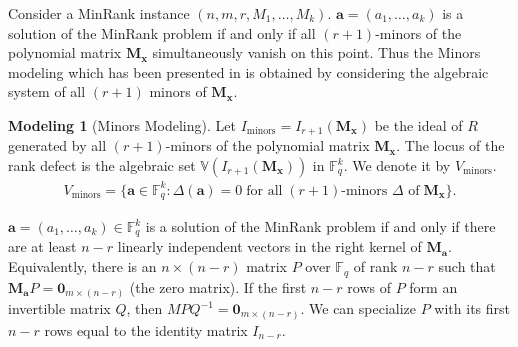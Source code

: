 \documentclass[a4paper, 11pt]{amsart}
\newcommand{\mb}[1]{\mathbb{#1}}
\newcommand{\td}[1]{\bm{#1}}
\newcommand{\tx}[1]{\text{#1}}
\newcommand{\fq}{\mathbb{F}_q}
\theoremstyle{definition}
\theoremstyle{definition}
\newtheorem{model}{Modeling}
\begin{document}
	Consider a MinRank instance $(n,m,r,M_1,\dots,M_k)$. $\td{a}=(a_1,\dots,a_k)$ is a solution of the MinRank problem if and only if all $(r+1)$-minors of the polynomial matrix $\td{M_x}$ simultaneously vanish on this point. Thus the Minors modeling which has been presented in \cite{Minors} is obtained by considering the algebraic system of all $(r+1)$ minors of $\td{M_x}$.
	\begin{model}[Minors Modeling]
		Let $I_{\tx{minors}}=I_{r+1}(\td{M_x})$ be the ideal of $R$ generated by all $(r+1)$-minors of the polynomial matrix $\td{M_x}$. The locus of the rank defect is the algebraic set $\mb{V}(I_{r+1}(\td{M_x}))$ in $\fq^k$. We denote it by $V_{\tx{minors}}$.
		\begin{align*}
			V_{\tx{minors}}=\{\td{a}\in\fq^k:\Delta(\td{a})=0\;\tx{for all}\;(r+1)\tx{-minors $\Delta$ of}\;\td{M_x}\}.
		\end{align*}
	\end{model}
	$\td{a}=(a_1,\dots,a_k)\in\fq^k$ is a solution of the MinRank problem if and only if there are at least $n-r$ linearly independent vectors in the right kernel of $\td{M_a}$. Equivalently, there is an $n\times (n-r)$ matrix $P$ over $\fq$ of rank $n-r$ such that $\td{M_a}P=\td{0}_{m\times(n-r)}$ (the zero matrix). If the first $n-r$ rows of $P$ form an invertible matrix $Q$, then $MPQ^{-1}=\td{0}_{m\times(n-r)}$.
	We can specialize $P$ with its first $n-r$ rows equal to the identity matrix $I_{n-r}$.
	
\end{document}
